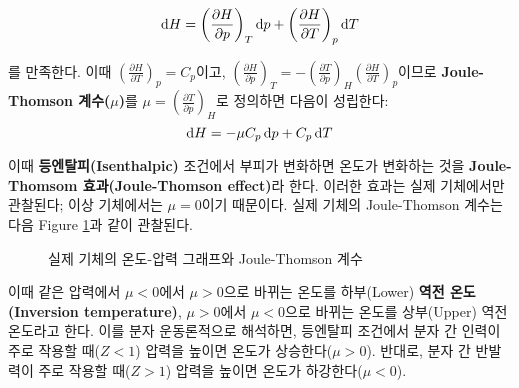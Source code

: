         \begin{cor}
        \begin{equation*}
            \operatorname{d\!} H = \left(\frac{\partial H}{\partial p}\right)_T \operatorname{d\!} p + \left(\frac{\partial H}{\partial T}\right)_p \operatorname{d\!} T
        \end{equation*}
        \end{cor}
        를 만족한다. 이때 $\displaystyle\left(\frac{\partial H}{\partial T}\right)_p = C_p$이고, 
        $\displaystyle\left(\frac{\partial H}{\partial p}\right)_T = -\left(\frac{\partial T}{\partial p}\right)_H \left(\frac{\partial H}{\partial T}\right)_p$이므로 
        \textbf{Joule-Thomson 계수($\mu$)}를 $\displaystyle\mu = \left(\frac{\partial T}{\partial p}\right)_H$로 정의하면 다음이 성립한다:
        \begin{equation*}
            \operatorname{d\!} H = -\mu C_p \operatorname{d\!} p + C_p \operatorname{d\!} T
        \end{equation*}
        \par 이때 \textbf{등엔탈피(Isenthalpic)} 조건에서 부피가 변화하면 온도가 변화하는 것을 \textbf{Joule-Thomsom 효과(Joule-Thomson effect)}라 한다. 
        이러한 효과는 실제 기체에서만 관찰된다; 이상 기체에서는 $\mu = 0$이기 때문이다. 실제 기체의 Joule-Thomson 계수는 다음 Figure \ref{f3}과 같이 관찰된다. 
        \begin{figure}[H]
            \centering
            \caption{실제 기체의 온도-압력 그래프와 Joule-Thomson 계수}\label{f3}
        \end{figure}
        \par 이때 같은 압력에서 $\mu < 0$에서 $\mu > 0$으로 바뀌는 온도를 하부(Lower) \textbf{역전 온도(Inversion temperature)}, $\mu > 0$에서 $\mu < 0$으로 바뀌는 온도를 
        상부(Upper) 역전 온도라고 한다. 이를 분자 운동론적으로 해석하면, 등엔탈피 조건에서 분자 간 인력이 주로 작용할 때($Z<1$) 압력을 높이면 온도가 상승한다($\mu>0$). 
        반대로, 분자 간 반발력이 주로 작용할 때($Z>1$) 압력을 높이면 온도가 하강한다($\mu<0$).
